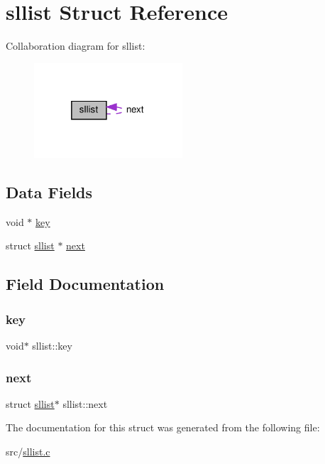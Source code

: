 \hypertarget{structsllist}{}\section{sllist Struct Reference}
\label{structsllist}


Collaboration diagram for sllist\+:
\nopagebreak
\begin{figure}[H]
\begin{center}
\leavevmode
\includegraphics[width=157pt]{structsllist__coll__graph}
\end{center}
\end{figure}
\subsection*{Data Fields}
\begin{DoxyCompactItemize}
\item 
void $\ast$ \hyperlink{structsllist_aba6ff88336afdd0d2a8cb0ce396f79b6}{key}
\item 
struct \hyperlink{structsllist}{sllist} $\ast$ \hyperlink{structsllist_abd84069b1b074a7ac7d94b65672d4fd3}{next}
\end{DoxyCompactItemize}


\subsection{Field Documentation}
\mbox{\label{structsllist_aba6ff88336afdd0d2a8cb0ce396f79b6}} 
\subsubsection{\texorpdfstring{key}{key}}
{\footnotesize\ttfamily void$\ast$ sllist\+::key}

\mbox{\label{structsllist_abd84069b1b074a7ac7d94b65672d4fd3}} 
\subsubsection{\texorpdfstring{next}{next}}
{\footnotesize\ttfamily struct \hyperlink{structsllist}{sllist}$\ast$ sllist\+::next}



The documentation for this struct was generated from the following file\+:\begin{DoxyCompactItemize}
\item 
src/\hyperlink{sllist_8c}{sllist.\+c}\end{DoxyCompactItemize}
